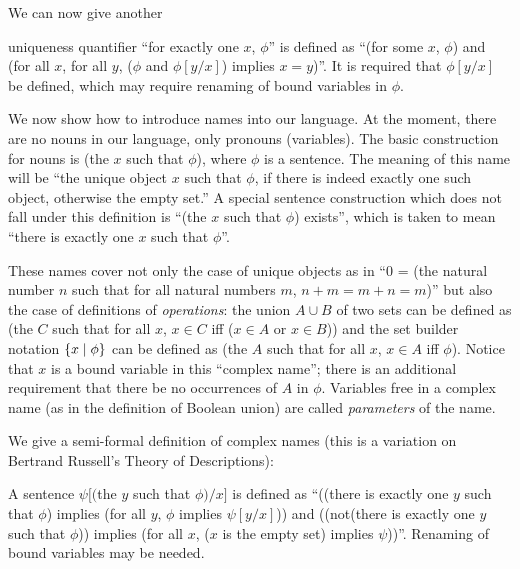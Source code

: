 We can now give another

\begin{Definition}{uniqueness quantifier}
 ``for exactly one $x$,
 $\phi$'' is defined as ``(for some $x$, $\phi$) and (for all $x$, for
 all $y$, ($\phi$ and $\phi[y/x]$) implies $x=y$)''.  It is required
 that $\phi[y/x]$ be defined, which may require renaming of bound
 variables in $\phi$.
\end{Definition} 

We now show how to introduce names into our language.  At the moment,
there are no nouns in our language, only pronouns (variables).  The
basic construction for nouns is (the $x$ such that $\phi$), where
$\phi$ is a sentence.  The meaning of this name will be ``the unique
object $x$ such that $\phi$, if there is indeed exactly one such
object, otherwise the empty set.''  A
special sentence construction 
which does not fall under this definition is ``(the $x$ such that
$\phi$) exists'', which is taken to mean ``there is exactly one $x$
such that $\phi$''.

These names cover not only the case of unique objects as in ``0 = (the
natural number $n$ such that for all natural numbers $m$,
$n+m = m+n = m$)'' but also the case of definitions of {\itshape operations\/}:
the union $A \cup B$ of two sets can be defined as (the $C$
such that for all $x$, $x \in C$ iff ($x\in A$ or $x \in B$)) and the set
builder notation $\{x \mid \phi\}$ can be defined as (the $A$ such that for
all $x$, $x \in A$ iff $\phi$).  Notice that $x$ is a bound variable
in this ``complex name''; there is an additional requirement that
there be no occurrences of $A$ in $\phi$.  Variables free in a complex
name (as in the definition of Boolean union)
are called {\itshape parameters\/} of the name.

We give a semi-formal definition of complex names (this is a variation
on Bertrand Russell's Theory of Descriptions):

\begin{definition}
 A sentence $\psi[($the $y$ such that $\phi)/x]$ is
 defined as ``((there is exactly one $y$ such that $\phi$) implies (for
 all $y$, $\phi$ implies $\psi[y/x]$)) and ((not(there is exactly one
 $y$ such that $\phi$)) implies (for all $x$, ($x$ is the empty set) implies $\psi$))''.  Renaming of bound variables may be needed.
\end{definition}

